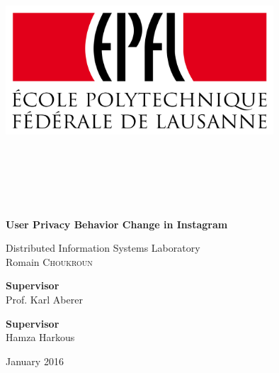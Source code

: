 \documentclass{article}
\begin{document}
\begin{titlepage}
  \begin{center}
    \includegraphics[width=10cm, height=10cm, keepaspectratio]{epfl}
    \vspace*{0.5cm}
    
    \Huge
    \textbf{User Privacy Behavior Change in Instagram}
    
    \vspace{5cm}
    
    \Large
    Distributed Information Systems Laboratory\\
    \vspace{1cm}
    Romain \textsc{Choukroun}\\

    \vspace{1cm}
    \begin{multicols}{2}
      \begin{flushleft}
      \textbf{Supervisor}\\
      Prof. Karl Aberer
      \end{flushleft}
      \begin{flushright}
      \textbf{Supervisor}\\
      Hamza Harkous
      \end{flushright}
    \end{multicols}

    \vfill
    
    \large
    January 2016
        
    \end{center}
\end{titlepage}
\end{document}
